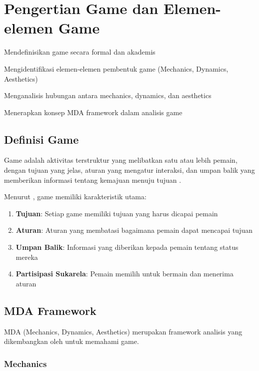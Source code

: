\section{Pengertian Game dan Elemen-elemen Game}

\begin{learningoutcomes}
\item Mendefinisikan game secara formal dan akademis
\item Mengidentifikasi elemen-elemen pembentuk game (Mechanics, Dynamics, Aesthetics)
\item Menganalisis hubungan antara mechanics, dynamics, dan aesthetics
\item Menerapkan konsep MDA framework dalam analisis game
\end{learningoutcomes}

\subsection{Definisi Game}

\begin{definisi}[Game]
Game adalah aktivitas terstruktur yang melibatkan satu atau lebih pemain, dengan tujuan yang jelas, aturan yang mengatur interaksi, dan umpan balik yang memberikan informasi tentang kemajuan menuju tujuan \cite{Hunicke2004}.
\end{definisi}

Menurut \cite{Salen2004}, game memiliki karakteristik utama:
\begin{enumerate}
\item \textbf{Tujuan}: Setiap game memiliki tujuan yang harus dicapai pemain
\item \textbf{Aturan}: Aturan yang membatasi bagaimana pemain dapat mencapai tujuan
\item \textbf{Umpan Balik}: Informasi yang diberikan kepada pemain tentang status mereka
\item \textbf{Partisipasi Sukarela}: Pemain memilih untuk bermain dan menerima aturan
\end{enumerate}

\subsection{MDA Framework}

MDA (Mechanics, Dynamics, Aesthetics) merupakan framework analisis yang dikembangkan oleh \cite{Hunicke2004} untuk memahami game.

\subsubsection{Mechanics}


